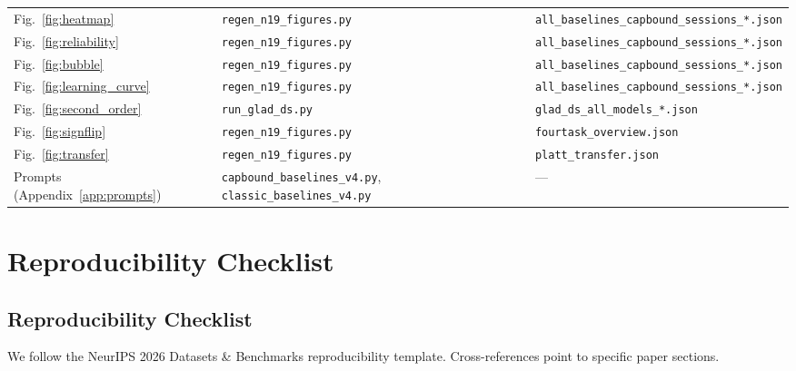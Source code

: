 \documentclass[11pt]{article}
\begin{document}
\begin{table}[h]
{\begin{tabular}{@{}l l l@{}}
Fig.~\ref{fig:heatmap}          & \texttt{regen\_n19\_figures.py}    & \texttt{all\_baselines\_capbound\_sessions\_*.json} \\
Fig.~\ref{fig:reliability}      & \texttt{regen\_n19\_figures.py}    & \texttt{all\_baselines\_capbound\_sessions\_*.json} \\
Fig.~\ref{fig:bubble}           & \texttt{regen\_n19\_figures.py}    & \texttt{all\_baselines\_capbound\_sessions\_*.json} \\
Fig.~\ref{fig:learning_curve}   & \texttt{regen\_n19\_figures.py}    & \texttt{all\_baselines\_capbound\_sessions\_*.json} \\
Fig.~\ref{fig:second_order}     & \texttt{run\_glad\_ds.py}          & \texttt{glad\_ds\_all\_models\_*.json} \\
Fig.~\ref{fig:signflip}         & \texttt{regen\_n19\_figures.py}    & \texttt{fourtask\_overview.json} \\
Fig.~\ref{fig:transfer}         & \texttt{regen\_n19\_figures.py}    & \texttt{platt\_transfer.json} \\
\midrule
Prompts (Appendix~\ref{app:prompts}) & \texttt{capbound\_baselines\_v4.py}, \texttt{classic\_baselines\_v4.py} & --- \\
\bottomrule
\end{tabular}}
\end{table}


\section{Reproducibility Checklist}
\label{app:group_h}

\subsection{Reproducibility Checklist}
\label{app:repro_checklist}

We follow the NeurIPS 2026 Datasets \& Benchmarks reproducibility template. Cross-references point to specific paper sections.
\end{document}

